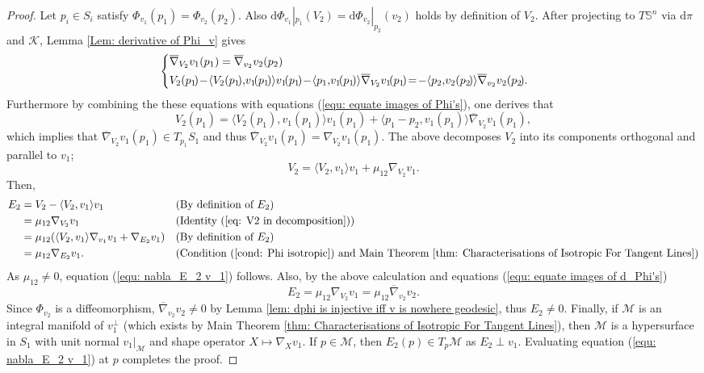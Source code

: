 \documentclass[12pt]{amsart}
\theoremstyle{plain}
\theoremstyle{definition}
\def\S{\mathbb{S}}
\newcommand{\td}{\mathrm{d}}
\numberwithin{equation}{section}
\begin{document}
\begin{proof}
    Let $p_i\in S_i$ satisfy $\Phi_{v_1}(p_1)=\Phi_{v_2}(p_2)$. Also $\td\Phi_{v_1}|_{p_1}(V_2)=\td\Phi_{v_2}|_{p_2}(v_2)$ holds by definition of $V_2$. After projecting to $T\S^n$ via $\td\pi$ and $\mathcal{K}$, Lemma \ref{Lem: derivative of Phi_v} gives\\
\begin{equation}
\hspace{-1.5em}
\label{equ: equate images of d_Phi's}
\left \{\begin{aligned}
&\overline\nabla_{V_2}v_1(p_1)=\overline\nabla_{v_2}v_2(p_2)\\
&V_2(p_1\!)\!-\!\langle V_2(p_1\!),\!v_1\!(p_1\!)\rangle v_1\!(p_1\!)\!-\!\langle p_1,\!v_1\!(p_1\!)\rangle \overline{\nabla}_{V_2}v_1\!(p_1\!)\!=\!-\langle p_2,\!v_2(p_2\!)\rangle \overline{\nabla}_{v_2}v_2(p_2\!).
\end{aligned}\right.
\end{equation}
Furthermore by combining the these equations with equations (\ref{equ: equate images of Phi's}), one derives that
\[V_2(p_1)=\langle V_2(p_1),v_1(p_1)\rangle v_1(p_1)+\langle p_1-p_2, v_1(p_1) \rangle\overline{\nabla}_{V_2}v_1(p_1),
\]
which implies that $\overline{\nabla}_{V_2}v_1(p_1)\in T_{p_1}S_1$ and thus $\overline{\nabla}_{V_2}v_1(p_1)=\nabla_{V_2}v_1(p_1)$. The above decomposes $V_2$ into its components orthogonal and parallel to $v_1$;
\begin{equation}\label{eq: V2 in decomposition}
    V_2=\langle V_2, v_1\rangle v_1+\mu_{12} \nabla_{V_2}v_1.
\end{equation}
    Then,
    \begin{align*}
        E_2&=V_2-\langle V_2, v_1\rangle v_1 &&\text{(By definition of $E_2$)}\\
        &=\mu_{12} \nabla_{V_2}v_1 &&\text{(Identity (\ref{eq: V2 in decomposition}))}\\
        &=\mu_{12}(\langle V_2, v_1\rangle \nabla_{v_1}v_1+\nabla_{E_2}v_1) &&\text{(By definition of $E_2$)}\\
        &=\mu_{12} \nabla_{ E_2} v_1. &&\text{(Condition (\ref{cond: Phi isotropic}) and Main Theorem \ref{thm: Characterisations of Isotropic For Tangent Lines})} 
    \end{align*}
As $\mu_{12}\neq 0$, equation (\ref{equ: nabla_E_2 v_1}) follows. Also, by the above calculation and equations (\ref{equ: equate images of d_Phi's})
\[
E_2=\mu_{12}\nabla_{V_2}v_1=\mu_{12}\overline{\nabla}_{v_2}v_2.
\]
Since $\Phi_{v_2}$ is a diffeomorphism, $\overline\nabla_{v_2}v_2\neq 0$ by Lemma \ref{lem: dphi is injective iff v is nowhere geodesic}, thus $E_2\neq 0$. Finally, if $\mathcal{M}$ is an integral manifold of $v_1^\bot$ (which exists by Main Theorem \ref{thm: Characterisations of Isotropic For Tangent Lines}), then $\mathcal{M}$ is a hypersurface in $S_1$ with unit normal $v_1|_\mathcal{M}$ and shape operator $X\mapsto \nabla_X v_1$. If $p\in \mathcal{M}$, then $E_2(p)\in T_p\mathcal{M}$ as $E_2\perp v_1$.  Evaluating equation (\ref{equ: nabla_E_2 v_1}) at $p$ completes the proof.
\end{proof}
\end{document}
